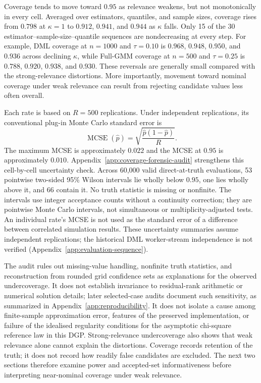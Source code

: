 Coverage tends to move toward $0.95$ as relevance weakens, but not monotonically in every cell. Averaged over estimators, quantiles, and sample sizes, coverage rises from $0.798$ at $\kappa=1$ to $0.912$, $0.941$, and $0.944$ as $\kappa$ falls. Only 15 of the 30 estimator--sample-size--quantile sequences are nondecreasing at every step. For example, DML coverage at $n=1000$ and $\tau=0.10$ is $0.968$, $0.948$, $0.950$, and $0.936$ across declining $\kappa$, while Full-GMM coverage at $n=500$ and $\tau=0.25$ is $0.788$, $0.920$, $0.938$, and $0.930$. These reversals are generally small compared with the strong-relevance distortions. More importantly, movement toward nominal coverage under weak relevance can result from rejecting candidate values less often overall.

Each rate is based on $R=500$ replications. Under independent replications, its conventional plug-in Monte Carlo standard error is
\[
\operatorname{MCSE}(\widehat p)
=
\sqrt{\frac{\widehat p(1-\widehat p)}{R}}.
\]
The maximum MCSE is approximately $0.022$ and the MCSE at $0.95$ is approximately $0.010$. Appendix~\ref{app:coverage-forensic-audit} strengthens this cell-by-cell uncertainty check. Across 60,000 valid direct-at-truth evaluations, 53 pointwise two-sided 95\% Wilson intervals lie wholly below $0.95$, one lies wholly above it, and 66 contain it. No truth statistic is missing or nonfinite. The intervals use integer acceptance counts without a continuity correction; they are pointwise Monte Carlo intervals, not simultaneous or multiplicity-adjusted tests. An individual rate's MCSE is not used as the standard error of a difference between correlated simulation results. These uncertainty summaries assume independent replications; the historical DML worker-stream independence is not verified (Appendix~\ref{app:evaluation-sequence}).

The audit rules out missing-value handling, nonfinite truth statistics, and reconstruction from rounded grid confidence sets as explanations for the observed undercoverage. It does not establish invariance to residual-rank arithmetic or numerical solution details; later selected-case audits document such sensitivity, as summarized in Appendix~\ref{app:reproducibility}. It does not isolate a cause among finite-sample approximation error, features of the preserved implementation, or failure of the idealised regularity conditions for the asymptotic chi-square reference law in this DGP. Strong-relevance undercoverage also shows that weak relevance alone cannot explain the distortions. Coverage records retention of the truth; it does not record how readily false candidates are excluded. The next two sections therefore examine power and accepted-set informativeness before interpreting near-nominal coverage under weak relevance.

